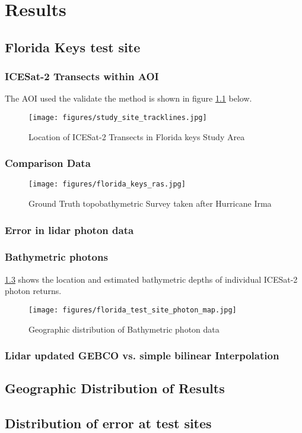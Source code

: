 \chapter{Results}

\section{Florida Keys test site}
\subsection{ICESat-2 Transects within AOI}
The AOI used the validate the method is shown in figure \ref{fig:keys_transects} below. 
\begin{figure}[h!]
    \centering
    \texttt{[image: figures/study\_site\_tracklines.jpg]}
    \caption{Location of ICESat-2 Transects in Florida keys Study Area}
    \label{fig:keys_transects}
\end{figure}
\subsection{Comparison Data}

\begin{figure}[h!]
    \centering
    \texttt{[image: figures/florida\_keys\_ras.jpg]}
    \caption{Ground Truth topobathymetric Survey taken after Hurricane Irma}
    \label{fig:truebathy}
\end{figure}
\subsection{Error in lidar photon data}

% 

% 

\subsection{Bathymetric photons}
\ref{fig:bathyphotonmap} shows the location and estimated bathymetric depths of individual ICESat-2 photon returns.
\begin{figure}[h!]
    \centering
    \texttt{[image: figures/florida\_test\_site\_photon\_map.jpg]}
    \caption{Geographic distribution of Bathymetric photon data}
    \label{fig:bathyphotonmap}
\end{figure}

\subsection{Lidar updated GEBCO vs. simple bilinear Interpolation}


\section{Geographic Distribution of Results}
\section{Distribution of error at test sites}